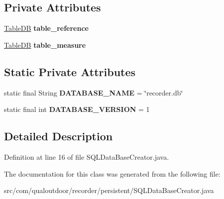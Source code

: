 \subsection*{Private Attributes}
\begin{DoxyCompactItemize}
\item 
\hypertarget{classcom_1_1qualoutdoor_1_1recorder_1_1persistent_1_1SQLDataBaseCreator_a9edb3a7d059e5b5186162e0984c5fefb}{\hyperlink{classcom_1_1qualoutdoor_1_1recorder_1_1persistent_1_1TableDB}{Table\-D\-B} {\bfseries table\-\_\-reference}}\label{classcom_1_1qualoutdoor_1_1recorder_1_1persistent_1_1SQLDataBaseCreator_a9edb3a7d059e5b5186162e0984c5fefb}

\item 
\hypertarget{classcom_1_1qualoutdoor_1_1recorder_1_1persistent_1_1SQLDataBaseCreator_acaf0468c598c8ec66226928571b78274}{\hyperlink{classcom_1_1qualoutdoor_1_1recorder_1_1persistent_1_1TableDB}{Table\-D\-B} {\bfseries table\-\_\-measure}}\label{classcom_1_1qualoutdoor_1_1recorder_1_1persistent_1_1SQLDataBaseCreator_acaf0468c598c8ec66226928571b78274}

\end{DoxyCompactItemize}
\subsection*{Static Private Attributes}
\begin{DoxyCompactItemize}
\item 
\hypertarget{classcom_1_1qualoutdoor_1_1recorder_1_1persistent_1_1SQLDataBaseCreator_a6a350c1592320d18bfba224bfa63cf25}{static final String {\bfseries D\-A\-T\-A\-B\-A\-S\-E\-\_\-\-N\-A\-M\-E} = \char`\"{}recorder.\-db\char`\"{}}\label{classcom_1_1qualoutdoor_1_1recorder_1_1persistent_1_1SQLDataBaseCreator_a6a350c1592320d18bfba224bfa63cf25}

\item 
\hypertarget{classcom_1_1qualoutdoor_1_1recorder_1_1persistent_1_1SQLDataBaseCreator_ae81405dc3760f4358051e4b6f4939e37}{static final int {\bfseries D\-A\-T\-A\-B\-A\-S\-E\-\_\-\-V\-E\-R\-S\-I\-O\-N} = 1}\label{classcom_1_1qualoutdoor_1_1recorder_1_1persistent_1_1SQLDataBaseCreator_ae81405dc3760f4358051e4b6f4939e37}

\end{DoxyCompactItemize}


\subsection{Detailed Description}


Definition at line 16 of file S\-Q\-L\-Data\-Base\-Creator.\-java.



The documentation for this class was generated from the following file\-:\begin{DoxyCompactItemize}
\item 
src/com/qualoutdoor/recorder/persistent/S\-Q\-L\-Data\-Base\-Creator.\-java\end{DoxyCompactItemize}
